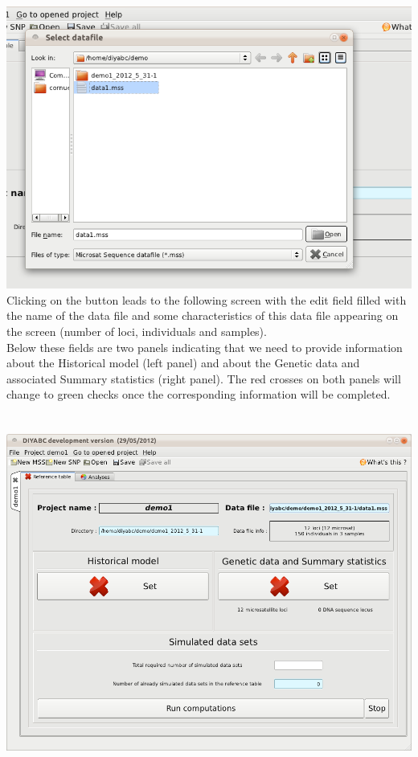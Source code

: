 \includegraphics[scale=0.35]{gui_pictures/Capture-DIYABC-9.png} 
\\
Clicking on the  button leads  to the following screen with the edit field filled with the name of the data file and some characteristics of this data file appearing on the screen (number of loci, individuals and samples).\\
Below these fields are two panels indicating that we need to provide information about the Historical model (left panel) and about the Genetic data and associated Summary statistics (right panel). The red crosses on both panels will change to green checks once the corresponding information will be completed.\\ 
\\
\\
\includegraphics[scale=0.35]{gui_pictures/Capture-DIYABC-10.png} 
\newpage
